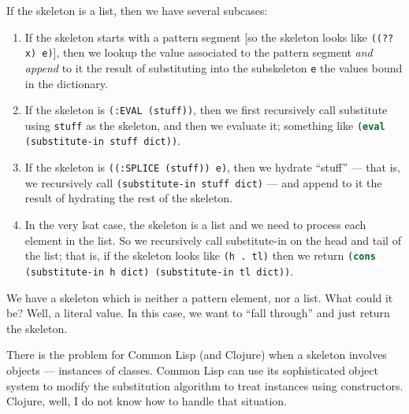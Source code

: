 If the skeleton is a list, then we have several subcases:
\begin{enumerate}
\item If the skeleton starts with a pattern segment
  [so the skeleton looks like \lstinline[language=lisp]{((?? x) e)}],
  then we lookup the value associated
  to the pattern segment \emph{and append} to it the result of
  substituting into the subskeleton \lstinline[language=lisp]{e} the
  values bound in the dictionary.
\item If the skeleton is \lstinline[language=lisp]{(:EVAL (stuff))},
  then we first recursively call substitute using \lstinline[language=lisp]{stuff}
  as the skeleton, and then we evaluate it;
  something like \lstinline[language=lisp]{(eval (substitute-in stuff dict))}.
\item If the skeleton is \lstinline[language=lisp]{((:SPLICE (stuff)) e)},
  then we hydrate ``stuff'' --- that is, we recursively call
  \lstinline[language=lisp]{(substitute-in stuff dict)} --- and append
  to it the result of hydrating the rest of the skeleton.
\item In the very lsat case, the skeleton is a list and we need to
  process each element in the list. So we recursively call substitute-in
  on the head and tail of the list;
  that is, if the skeleton looks like \lstinline[language=lisp]{(h . tl)}
  then we return
  \lstinline[language=lisp]{(cons (substitute-in h dict) (substitute-in tl dict))}.
\end{enumerate}

We have a skeleton which is neither a pattern element, nor a list. What
could it be? Well, a literal value. In this case, we want to ``fall
through'' and just return the skeleton.\quad\qedsymbol

\begin{remark}
There is the problem for Common Lisp (and Clojure) when a skeleton
involves objects --- instances of classes. Common Lisp can use its
sophisticated object system to modify the substitution algorithm to
treat instances using constructors. Clojure, well, I do not know how to
handle that situation.
\end{remark}
